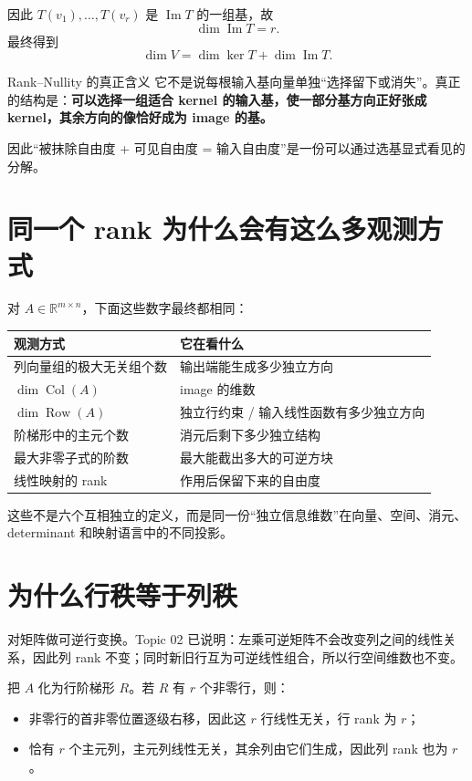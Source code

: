 \documentclass[11pt,a4paper]{ctexart}
\newcommand{\kw}[1]{\textbf{\color{deep}#1}}
\begin{document}
因此 $T(v_1),\dots,T(v_r)$ 是 $\operatorname{Im}T$ 的一组基，故
\[
\dim\operatorname{Im}T=r.
\]
最终得到
\[
\boxed{
\dim V
=\dim\ker T+\dim\operatorname{Im}T.
}
\]

\begin{corebox}{Rank--Nullity 的真正含义}
它不是说每根输入基向量单独“选择留下或消失”。真正的结构是：\kw{可以选择一组适合 kernel 的输入基，使一部分基方向正好张成 kernel，其余方向的像恰好成为 image 的基。}

因此“被抹除自由度 + 可见自由度 = 输入自由度”是一份可以通过选基显式看见的分解。
\end{corebox}

\section{同一个 rank 为什么会有这么多观测方式}

对 $A\in\mathbb R^{m\times n}$，下面这些数字最终都相同：

\begin{longtable}{L{4.2cm}L{\dimexpr\linewidth-4.7cm\relax}}
\toprule
\textbf{观测方式} & \textbf{它在看什么}\\
\midrule
列向量组的极大无关组个数 & 输出端能生成多少独立方向\\
$\dim\operatorname{Col}(A)$ & image 的维数\\
$\dim\operatorname{Row}(A)$ & 独立行约束 / 输入线性函数有多少独立方向\\
阶梯形中的主元个数 & 消元后剩下多少独立结构\\
最大非零子式的阶数 & 最大能截出多大的可逆方块\\
线性映射的 rank & 作用后保留下来的自由度\\
\bottomrule
\end{longtable}

这些不是六个互相独立的定义，而是同一份“独立信息维数”在向量、空间、消元、determinant 和映射语言中的不同投影。

\section{为什么行秩等于列秩}

对矩阵做可逆行变换。Topic 02 已说明：左乘可逆矩阵不会改变列之间的线性关系，因此列 rank 不变；同时新旧行互为可逆线性组合，所以行空间维数也不变。

把 $A$ 化为行阶梯形 $R$。若 $R$ 有 $r$ 个非零行，则：

\begin{itemize}
  \item 非零行的首非零位置逐级右移，因此这 $r$ 行线性无关，行 rank 为 $r$；
  \item 恰有 $r$ 个主元列，主元列线性无关，其余列由它们生成，因此列 rank 也为 $r$。
\end{itemize}
\end{document}
